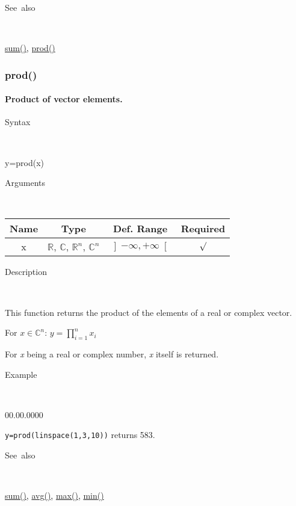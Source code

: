 \begin{description}
\item [See~also]~
\end{description}
\textcolor{blue}{\hyperlink{sum}{sum()}}\textcolor{black}{,} \textcolor{blue}{\hyperlink{prod}{prod()}}


\newpage
\subsubsection*{\hypertarget{prod}{}{\Large prod()}}


\paragraph{\label{par:Prod}Product of vector elements.}

\begin{description}
\item [Syntax]~
\end{description}
y=prod(x)

\begin{description}
\item [Arguments]~
\end{description}
\begin{tabular}{|c|c|c|c|}
\hline 
Name&
Type&
Def. Range&
Required\tabularnewline
\hline
\hline 
x&
$\mathbb{R}$, $\mathbb{C}$, $\mathbb{R}^{n}$, $\mathbb{C}^{n}$&
$\left]-\infty,+\infty\right[$&
$\surd$\tabularnewline
\hline
\end{tabular}

\begin{description}
\item [Description]~
\end{description}
This function returns the product of the elements of a real or complex
vector.

\medskip{}
For $x\in$$\mathbb{C}^{n}$: $y=$$\prod\limits _{i=1}^{n}x_{i}$
\medskip{}

For \textit{x} being a real or complex number, \textit{x} itself is
returned.

\begin{description}
\item [Example]~
\end{description}
\begin{lyxlist}{00.00.0000}
\item [\texttt{y=prod(linspace(1,3,10))}]returns 583.
\end{lyxlist}
\begin{description}
\item [See~also]~
\end{description}
\textcolor{blue}{\hyperlink{sum}{sum()}}\textcolor{black}{,} \textcolor{blue}{\hyperlink{avg}{avg()}}\textcolor{black}{,}
\textcolor{blue}{\hyperlink{max}{max()}}\textcolor{black}{,} \textcolor{blue}{\hyperlink{min}{min()}}


